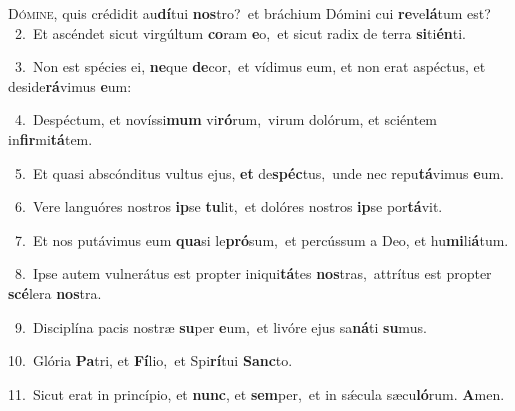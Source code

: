 \lettrine{\initial\textcolor{\initialcolor}{D}}{ómine,} quis crédidit au\-\textbf{dí}\-tui \textbf{nos}\-tro?~\star et bráchium Dómini cui \textbf{re}\-ve\-\textbf{lá}\-tum est?\\
{\numbfont\textcolor{\numbcolor}{~2.}}~Et ascéndet sicut virgúltum \textbf{co}\-ram \textbf{e}\-o,~\star et sicut radix de terra \textbf{si}\-ti\-\textbf{én}\-ti.\par
{\numbfont\textcolor{\numbcolor}{~3.}}~Non est spécies ei, \textbf{ne}\-que \textbf{de}\-cor,~\star et vídimus eum, et non erat aspéctus, et deside\-\textbf{rá}\-vimus \textbf{e}\-um:\par
{\numbfont\textcolor{\numbcolor}{~4.}}~Despéctum, et novíssi\textbf{mum} vi\-\textbf{ró}\-rum,~\star virum dolórum, et sciéntem in\-\textbf{fir}\-mi\-\textbf{tá}\-tem.\par
{\numbfont\textcolor{\numbcolor}{~5.}}~Et quasi abscónditus vultus ejus, \textbf{et} de\-\textbf{spéc}\-tus,~\star unde nec repu\-\textbf{tá}\-vimus \textbf{e}\-um.\par
{\numbfont\textcolor{\numbcolor}{~6.}}~Vere languóres nostros \textbf{ip}\-se \textbf{tu}\-lit,~\star et dolóres nostros \textbf{ip}\-se por\-\textbf{tá}\-vit.\par
{\numbfont\textcolor{\numbcolor}{~7.}}~Et nos putávimus eum \textbf{qua}\-si le\-\textbf{pró}\-sum,~\star et percússum a Deo, et hu\-\textbf{mi}\-li\-\textbf{á}\-tum.\par
{\numbfont\textcolor{\numbcolor}{~8.}}~Ipse autem vulnerátus est propter iniqui\-\textbf{tá}\-tes \textbf{nos}\-tras,~\star attrítus est propter \textbf{scé}\-lera \textbf{nos}\-tra.\par
{\numbfont\textcolor{\numbcolor}{~9.}}~Disciplína pacis nostræ \textbf{su}\-per \textbf{e}\-um,~\star et livóre ejus sa\-\textbf{ná}\-ti \textbf{su}\-mus.\par
{\numbfont\textcolor{\numbcolor}{10.}}~Glória \textbf{Pa}\-tri, et \textbf{Fí}\-lio,~\star et Spi\-\textbf{rí}\-tui \textbf{Sanc}\-to.\par
{\numbfont\textcolor{\numbcolor}{11.}}~Sicut erat in princípio, et \textbf{nunc}\-, et \textbf{sem}\-per,~\star et in sǽcula sæcu\-\textbf{ló}\-rum. \textbf{A}\-men.\par
